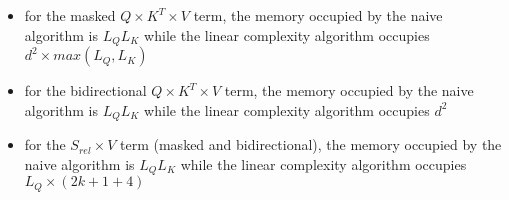 \begin{itemize}
\item
for the masked $Q \times K^T \times V$ term, the memory occupied by
the naive algorithm is $L_QL_K$ while the linear complexity
algorithm occupies $d^2 \times max(L_Q, L_K)$
\item
for the bidirectional $Q \times K^T \times V$ term, the memory
occupied by the naive algorithm is $L_QL_K$ while the linear
complexity algorithm occupies $d^2$
\item
for the $S_{rel} \times V$ term (masked and bidirectional), the
memory occupied by the naive algorithm is $L_QL_K$ while the linear
complexity algorithm occupies $L_Q \times (2k+1 + 4)$
\end{itemize}

\endinput
